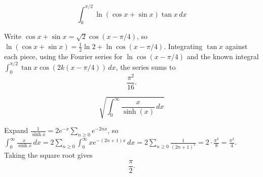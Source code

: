 \begin{questions}
\question
\[
\int_0^{\pi/2} \ln(\cos x+\sin x)\tan x \, dx
\]
\begin{solution}
Write $\cos x+\sin x=\sqrt2\cos(x-\pi/4)$, so $\ln(\cos x+\sin x)=\tfrac12\ln2+\ln\cos(x-\pi/4)$. Integrating $\tan x$ against each piece, using the Fourier series for $\ln\cos(x-\pi/4)$ and the known integral $\int_0^{\pi/2}\tan x\cos(2k(x-\pi/4))\,dx$, the series sums to
\[
\frac{\pi^2}{16}.
\]
\end{solution}

\question
\[
\sqrt{\int_0^{\infty} \frac{x}{\sinh(x)} \, dx}
\]
\begin{solution}
Expand $\frac{1}{\sinh x}=2e^{-x}\sum_{n\ge0}e^{-2nx}$, so $\int_0^\infty \frac{x}{\sinh x}\,dx = 2\sum_{n\ge0}\int_0^\infty x e^{-(2n+1)x}\,dx = 2\sum_{n\ge0}\frac{1}{(2n+1)^2}=2\cdot\frac{\pi^2}{8}=\frac{\pi^2}{4}$. Taking the square root gives
\[
\frac{\pi}{2}.
\]
\end{solution}

\end{questions}

